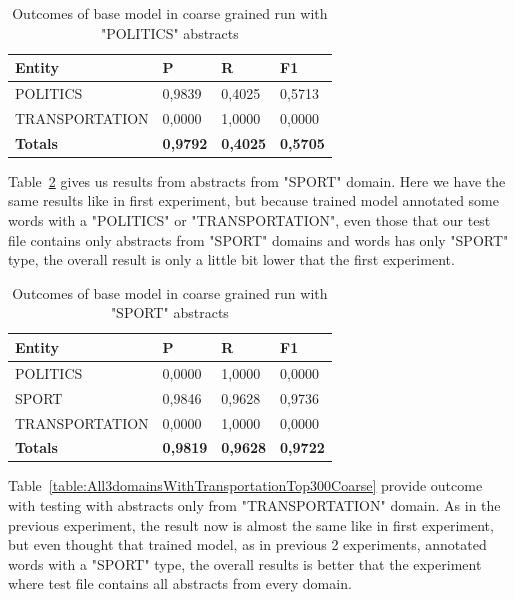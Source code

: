 \documentclass[thesis=M,english]{FITthesis}[2018/05/30]
\begin{document}
	\begin{table}[H]\centering
		\begin{tabular}{|l|l|l|l|}
			\hline {\textbf{Entity}} & {\textbf{P}} & {\textbf{R}} & {\textbf{F1}}\\\hline
				POLITICS & 0,9839 & 0,4025 & 0,5713\\
				TRANSPORTATION & 0,0000 & 1,0000 & 0,0000\\\hline
				\textbf{Totals} & \textbf{0,9792} & \textbf{0,4025} & \textbf{0,5705}\\\hline
		\end{tabular}
		\caption{Outcomes of base model in coarse grained run with "POLITICS" abstracts\label{table:All3domainsWithPoliticsTop300Coarse}}
	\end{table}	
	
	Table~\ref{table:All3domainsWithSportTop300Coarse} gives us results from abstracts from "SPORT" domain. Here we have the same results like in first experiment, but because trained model annotated some words with a "POLITICS" or "TRANSPORTATION", even those that our test file contains only abstracts from "SPORT" domains and words has only "SPORT" type, the overall result is only a little bit lower that the first experiment.

	\begin{table}[H]\centering
		\begin{tabular}{|l|l|l|l|}
			\hline {\textbf{Entity}} & {\textbf{P}} & {\textbf{R}} & {\textbf{F1}}\\\hline
				POLITICS & 0,0000 & 1,0000 & 0,0000\\
				SPORT & 0,9846 & 0,9628 & 0,9736\\
				TRANSPORTATION & 0,0000 & 1,0000 & 0,0000\\\hline
				\textbf{Totals} & \textbf{0,9819} & \textbf{0,9628} & \textbf{0,9722}\\\hline
		\end{tabular}
		\caption{Outcomes of base model in coarse grained run with "SPORT" abstracts \label{table:All3domainsWithSportTop300Coarse}}
	\end{table}	
	
	Table~\ref{table:All3domainsWithTransportationTop300Coarse} provide outcome with testing with abstracts only from "TRANSPORTATION" domain. As in the previous experiment, the result now is almost the same like in first experiment, but even thought that trained model, as in previous 2 experiments, annotated words with a "SPORT" type, the overall results is better that the experiment where test file contains all abstracts from every domain. 
	
\end{document}
